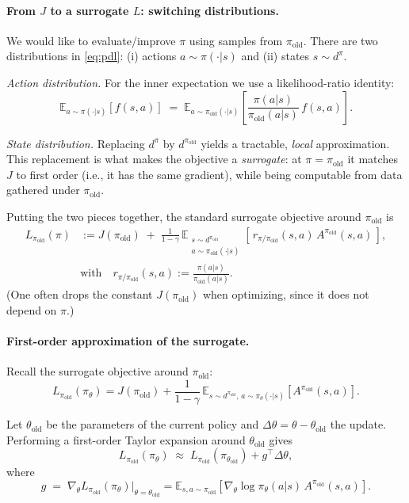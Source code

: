 \paragraph{From $J$ to a surrogate $L$: switching distributions.}
We would like to evaluate/improve $\pi$ using samples from $\pi_{\text{old}}$.
There are two distributions in \eqref{eq:pdl}:
(i) actions $a \sim \pi(\cdot|s)$ and (ii) states $s \sim d^{\pi}$.

\emph{Action distribution.}
For the inner expectation we use a likelihood-ratio identity:
\[
\mathbb{E}_{a \sim \pi(\cdot|s)}[f(s,a)]
\;=\;
\mathbb{E}_{a \sim \pi_{\text{old}}(\cdot|s)}
\!\left[ \frac{\pi(a|s)}{\pi_{\text{old}}(a|s)}\, f(s,a) \right].
\]

\emph{State distribution.}
Replacing $d^{\pi}$ by $d^{\pi_{\text{old}}}$ yields a tractable, \emph{local} approximation.
This replacement is what makes the objective a \emph{surrogate}: at $\pi=\pi_{\text{old}}$ it matches $J$
to first order (i.e., it has the same gradient), while being computable from data gathered under $\pi_{\text{old}}$.

Putting the two pieces together, the standard surrogate objective around $\pi_{\text{old}}$ is
\begin{align}
\label{eq:surrogate}
L_{\pi_{\text{old}}}(\pi)
&:= J(\pi_{\text{old}})
\;+\;
\frac{1}{1-\gamma}\,
\mathbb{E}_{\substack{s \sim d^{\pi_{\text{old}}}\\ a \sim \pi_{\text{old}}(\cdot|s)}}
\!\left[\, r_{\pi/\pi_{\text{old}}}(s,a)\, A^{\pi_{\text{old}}}(s,a) \,\right],
\\[-2mm]
&\text{with}\quad
r_{\pi/\pi_{\text{old}}}(s,a) := \frac{\pi(a|s)}{\pi_{\text{old}}(a|s)}.
\nonumber
\end{align}
(One often drops the constant $J(\pi_{\text{old}})$ when optimizing, since it does not depend on $\pi$.)


\paragraph{First-order approximation of the surrogate.}
Recall the surrogate objective around $\pi_{\text{old}}$:
\[
L_{\pi_{\text{old}}}(\pi_\theta) 
= J(\pi_{\text{old}})
+ \frac{1}{1-\gamma}\,
\mathbb{E}_{s \sim d^{\pi_{\text{old}}},\, a \sim \pi_\theta(\cdot|s)}
\!\left[ A^{\pi_{\text{old}}}(s,a) \right].
\]

Let $\theta_{\text{old}}$ be the parameters of the current policy and
$\Delta\theta = \theta - \theta_{\text{old}}$ the update.
Performing a first-order Taylor expansion around $\theta_{\text{old}}$ gives
\[
L_{\pi_{\text{old}}}(\pi_\theta)
\;\approx\;
L_{\pi_{\text{old}}}(\pi_{\theta_{\text{old}}})
+ g^\top \Delta\theta,
\]
where
\[
g \;=\; \nabla_\theta L_{\pi_{\text{old}}}(\pi_\theta)\big|_{\theta=\theta_{\text{old}}}
= \mathbb{E}_{s,a \sim \pi_{\text{old}}}
\!\left[ \nabla_\theta \log \pi_\theta(a|s)\, A^{\pi_{\text{old}}}(s,a) \right].
\]

